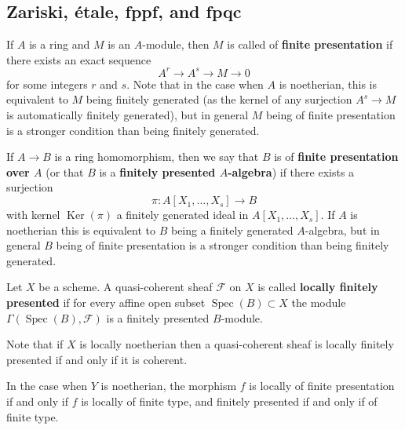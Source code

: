 \documentclass[12pt]{article}
\begin{document}
\subsection{Zariski, étale, fppf, and fpqc}

\begin{definition}
    If $A$ is a ring and $M$ is an $A$-module, then $M$ is called of \textbf{finite presentation} if there exists an exact sequence
    \[
        A^r \to A^s \to M \to 0
    \]
    for some integers $r$ and $s$. Note that in the case when $A$ is noetherian, this is equivalent to $M$ being finitely generated (as the kernel of any surjection $A^s \to M$ is automatically finitely generated), but in general $M$ being of finite presentation is a stronger condition than being finitely generated.

    If $A \to B$ is a ring homomorphism, then we say that $B$ is of \textbf{finite presentation over $A$} (or that $B$ is a \textbf{finitely presented $A$-algebra}) if there exists a surjection
    \[
        \pi : A[X_1,\ldots,X_s] \to B
    \]
    with kernel $\operatorname{Ker}(\pi)$ a finitely generated ideal in $A[X_1,\ldots,X_s]$. If $A$ is noetherian this is equivalent to $B$ being a finitely generated $A$-algebra, but in general $B$ being of finite presentation is a stronger condition than being finitely generated.

    Let $X$ be a scheme. A quasi-coherent sheaf $\mathcal{F}$ on $X$ is called \textbf{locally finitely presented} if for every affine open subset $\operatorname{Spec}(B) \subset X$ the module $\Gamma(\operatorname{Spec}(B), \mathcal{F})$ is a finitely presented $B$-module.

    Note that if $X$ is locally noetherian then a quasi-coherent sheaf is locally finitely presented if and only if it is coherent.

    In the case when $Y$ is noetherian, the morphism $f$ is locally of finite presentation if and only if $f$ is locally of finite type, and finitely presented if and only if of finite type.
\end{definition}
\end{document}
